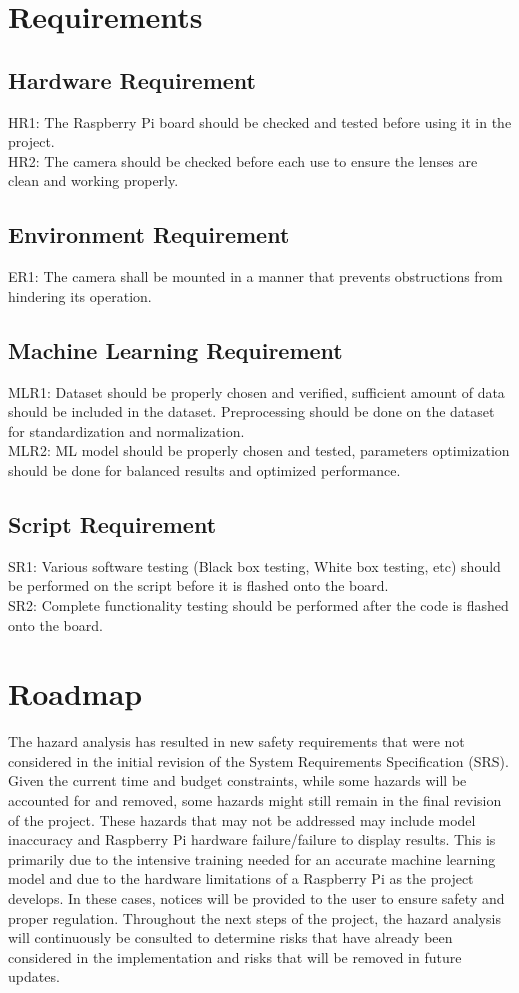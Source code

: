 \documentclass{article}
\begin{document}
\section{Requirements}
\subsection{Hardware Requirement}
HR1: The Raspberry Pi board should be checked and tested before using it in the project.\\
HR2: The camera should be checked before each use to ensure the lenses are clean and working properly.
\subsection{Environment Requirement}
ER1: The camera shall be mounted in a manner that prevents obstructions from hindering its operation.
\subsection{Machine Learning Requirement}
MLR1: Dataset should be properly chosen and verified, sufficient amount of data should be included in the dataset. Preprocessing should be done on the dataset for standardization and normalization.\\
MLR2: ML model should be properly chosen and tested, parameters optimization should be done for balanced results and optimized performance.
\subsection{Script Requirement}
SR1: Various software testing (Black box testing, White box testing, etc) should be performed on the script before it is flashed onto the board.\\
SR2: Complete functionality testing should be performed after the code is flashed onto the board.

\section{Roadmap}
The hazard analysis has resulted in new safety requirements that were not considered in the initial revision of the 
System Requirements Specification (SRS). Given the current time and budget constraints, while some hazards will be accounted 
for and removed, some hazards might still remain in the final revision of the project. These hazards that may not be addressed may include
model inaccuracy and Raspberry Pi hardware failure/failure to display results. This is primarily due to the intensive training needed
for an accurate machine learning model and due to the hardware limitations of a Raspberry Pi as the project develops. In these cases, notices 
will be provided to the user to ensure safety and proper regulation. Throughout the next steps of the project, the hazard analysis will continuously 
be consulted to determine risks that have already been considered in the implementation and risks that will be removed in future updates.
\end{document}
